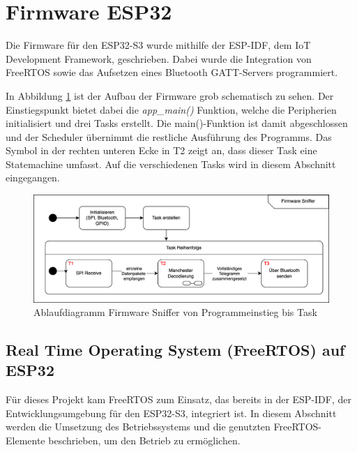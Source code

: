 

\section{Firmware ESP32}

Die Firmware für den ESP32-S3 wurde mithilfe der ESP-IDF, dem IoT Development Framework, geschrieben. Dabei wurde die Integration von FreeRTOS sowie das Aufsetzen eines Bluetooth GATT-Servers programmiert. 

In Abbildung \ref{fig:FSMEinleitung} ist der Aufbau der Firmware grob schematisch zu sehen. Der Einstiegspunkt bietet dabei die \textit{app\_main()} Funktion, welche die Peripherien initialisiert und drei Tasks erstellt. Die main()-Funktion ist damit abgeschlossen und der Scheduler übernimmt die restliche Ausführung des Programms. Das Symbol in der rechten unteren Ecke in T2 zeigt an, dass dieser Task eine Statemachine umfasst. Auf die verschiedenen Tasks wird in diesem Abschnitt eingegangen.

\begin{figure}[H]
    \centering
    \includegraphics[width=0.9\linewidth]{Figures/Chap3/ESP/Einleitung/FSM_Einleitung.png}
    \caption{Ablaufdiagramm Firmware Sniffer von Programmeinstieg bis Task}
    \label{fig:FSMEinleitung}
\end{figure}

\subsection{Real Time Operating System (FreeRTOS) auf ESP32}


Für dieses Projekt kam FreeRTOS zum Einsatz, das bereits in der ESP-IDF, der Entwicklungsumgebung für den ESP32-S3, integriert ist. \cite{FREERTOS_IDF_API} In diesem Abschnitt werden die Umsetzung des Betriebssystems und die genutzten FreeRTOS-Elemente beschrieben, um den Betrieb zu ermöglichen.

